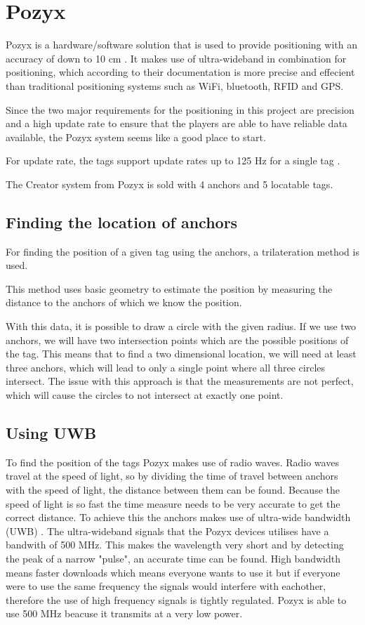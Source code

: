 \section{Pozyx}
Pozyx is a hardware/software solution that is used to provide positioning with an accuracy of down to 10 cm \cite{pozyx}.
It makes use of ultra-wideband in combination for positioning, which according to their documentation is more precise and effecient than traditional positioning systems such as WiFi, bluetooth, RFID and GPS.

Since the two major requirements for the positioning in this project are precision and a high update rate to ensure that the players are able to have reliable data available, the Pozyx system seems like a good place to start.

For update rate, the tags support update rates up to 125 Hz for a single tag \cite{pozyx}.

The Creator system from Pozyx is sold with 4 anchors and 5 locatable tags.
\subsection{Finding the location of anchors}
For finding the position of a given tag using the anchors, a trilateration method is used.

This method uses basic geometry to estimate the position by measuring the distance to the anchors of which we know the position.

With this data, it is possible to draw a circle with the given radius.
If we use two anchors, we will have two intersection points which are the possible positions of the tag.
This means that to find a two dimensional location, we will need at least three anchors, which will lead to only a single point where all three circles intersect.
The issue with this approach is that the measurements are not perfect, which will cause the circles to not intersect at exactly one point.

\subsection{Using UWB}
To find the position of the tags Pozyx makes use of radio waves. 
Radio waves travel at the speed of light, so by dividing the time of travel between anchors with the speed of light, the distance between them can be found.
Because the speed of light is so fast the time measure needs to be very accurate to get the correct distance.
To achieve this the anchors makes use of ultra-wide bandwidth (UWB) \cite{pozyx-UWB}.
The ultra-wideband signals that the Pozyx devices utilises have a bandwith of 500 MHz.
This makes the wavelength very short and by detecting the peak of a narrow "pulse", an accurate time can be found.
High bandwidth means faster downloads which means everyone wants to use it but if everyone were to use the same frequency the signals would interfere with eachother, therefore the use of high frequency signals is tightly regulated.
Pozyx is able to use 500 MHz beacuse it transmits at a very low power.


